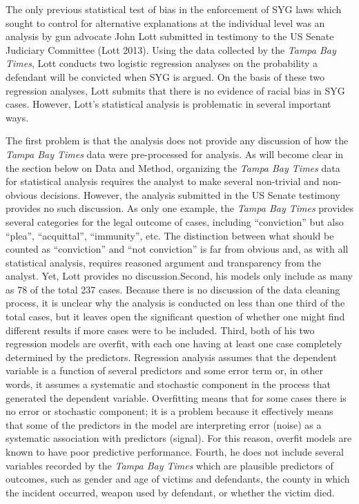 \documentclass[12pt,article]{article}
\begin{document}
The only previous statistical test of bias in the enforcement of SYG
laws which sought to control for alternative explanations at the
individual level was an analysis by gun advocate John Lott submitted in
testimony to the US Senate Judiciary Committee (Lott 2013). Using the
data collected by the \emph{Tampa Bay Times}, Lott conducts two logistic
regression analyses on the probability a defendant will be convicted
when SYG is argued. On the basis of these two regression analyses, Lott
submits that there is no evidence of racial bias in SYG cases. However,
Lott's statistical analysis is problematic in several important ways.

The first problem is that the analysis does not provide any discussion
of how the \emph{Tampa Bay Times} data were pre-processed for analysis.
As will become clear in the section below on Data and Method, organizing
the \emph{Tampa Bay Times} data for statistical analysis requires the
analyst to make several non-trivial and non-obvious decisions. However,
the analysis submitted in the US Senate testimony provides no such
discussion. As only one example, the \emph{Tampa Bay Times} provides
several categories for the legal outcome of cases, including
``conviction'' but also ``plea'', ``acquittal'', ``immunity'', etc. The
distinction between what should be counted as ``conviction'' and ``not
conviction'' is far from obvious and, as with all statistical analysis,
requires reasoned argument and transparency from the analyst. Yet, Lott
provides no discussion.Second, his models only include as many as 78 of
the total 237 cases. Because there is no discussion of the data cleaning
process, it is unclear why the analysis is conducted on less than one
third of the total cases, but it leaves open the significant question of
whether one might find different results if more cases were to be
included. Third, both of his two regression models are overfit, with
each one having at least one case completely determined by the
predictors. Regression analysis assumes that the dependent variable is a
function of several predictors and some error term or, in other words,
it assumes a systematic and stochastic component in the process that
generated the dependent variable. Overfitting means that for some cases
there is no error or stochastic component; it is a problem because it
effectively means that some of the predictors in the model are
interpreting error (noise) as a systematic association with predictors
(signal). For this reason, overfit models are known to have poor
predictive performance. Fourth, he does not include several variables
recorded by the \emph{Tampa Bay Times} which are plausible predictors of
outcomes, such as gender and age of victims and defendants, the county
in which the incident occurred, weapon used by defendant, or whether the
victim died.
\end{document}
